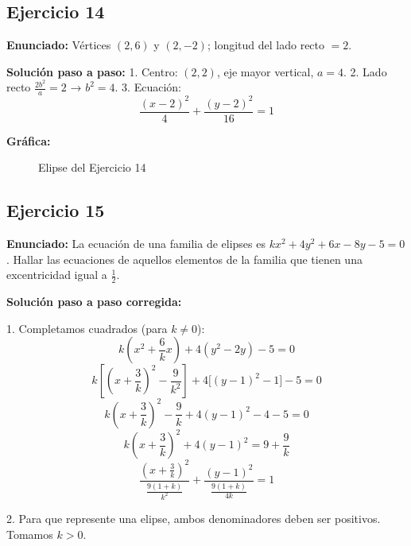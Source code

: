 \documentclass[12pt,a4paper]{article}
\begin{document}
\subsection{Ejercicio 14}
\textbf{Enunciado:} Vértices \((2,6)\) y \((2,-2)\); longitud del lado recto \(= 2\).

\textbf{Solución paso a paso:}
1. Centro: \((2,2)\), eje mayor vertical, \(a=4\).
2. Lado recto \(\frac{2b^2}{a} = 2\) → \(b^2 = 4\).
3. Ecuación:
   \[
   \frac{(x-2)^2}{4} + \frac{(y-2)^2}{16} = 1
   \]

\textbf{Gráfica:}
\begin{figure}[H]
\centering
{}
\caption{Elipse del Ejercicio 14}
\end{figure}
\newpage

\subsection{Ejercicio 15}
\textbf{Enunciado:} La ecuación de una familia de elipses es \(kx^2 + 4y^2 + 6x - 8y - 5 = 0\). Hallar las ecuaciones de aquellos elementos de la familia que tienen una excentricidad igual a \(\frac{1}{2}\).

\textbf{Solución paso a paso corregida:}

1. Completamos cuadrados (para \(k \neq 0\)):
   \[
   k\left(x^2 + \frac{6}{k}x\right) + 4(y^2 - 2y) - 5 = 0
   \]
   \[
   k\left[\left(x + \frac{3}{k}\right)^2 - \frac{9}{k^2}\right] + 4\bigl[(y-1)^2 - 1\bigr] - 5 = 0
   \]
   \[
   k\left(x + \frac{3}{k}\right)^2 - \frac{9}{k} + 4(y-1)^2 - 4 - 5 = 0
   \]
   \[
   k\left(x + \frac{3}{k}\right)^2 + 4(y-1)^2 = 9 + \frac{9}{k}
   \]
   \[
   \frac{\left(x + \frac{3}{k}\right)^2}{\frac{9(1+k)}{k^2}} + \frac{(y-1)^2}{\frac{9(1+k)}{4k}} = 1
   \]

2. Para que represente una elipse, ambos denominadores deben ser positivos. Tomamos \(k>0\).
\end{document}
